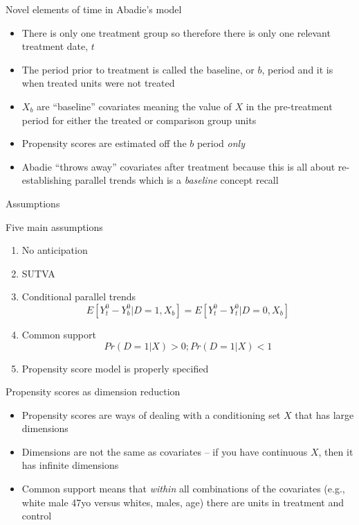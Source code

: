 \documentclass{beamer}
\begin{document}
\begin{frame}{Novel elements of time in Abadie's model}

\begin{itemize}
\item There is only one treatment group so therefore there is only one relevant treatment date, $t$
\item The period prior to treatment is called the baseline, or $b$, period and it is when treated units were not treated 
\item $X_b$ are ``baseline'' covariates meaning the value of $X$ in the pre-treatment period for either the treated or comparison group units
\item Propensity scores are estimated off the $b$ period \emph{only} 
\item Abadie ``throws away'' covariates after treatment because this is all about re-establishing parallel trends which is a \emph{baseline} concept recall
\end{itemize}

\end{frame}

\begin{frame}{Assumptions}

Five main assumptions

\begin{enumerate}
\item No anticipation 
\item SUTVA
\item Conditional parallel trends $$E[Y^0_t - Y^0_b|D=1,X_b] = E[Y^0_t - Y^0_t | D=0, X_b]$$ 
\item Common support $$Pr(D=1 | X)>0; Pr(D=1|X)<1$$ 
\item Propensity score model is properly specified 
\end{enumerate}

\end{frame}

\begin{frame}{Propensity scores as dimension reduction}

\begin{itemize}

\item Propensity scores are ways of dealing with a conditioning set $X$ that has large dimensions
\item Dimensions are not the same as covariates -- if you have continuous $X$, then it has infinite dimensions
\item Common support means that \emph{within} all combinations of the covariates (e.g., white male 47yo versus whites, males, age) there are units in treatment and control

\end{itemize}

\end{frame}
\end{document}
